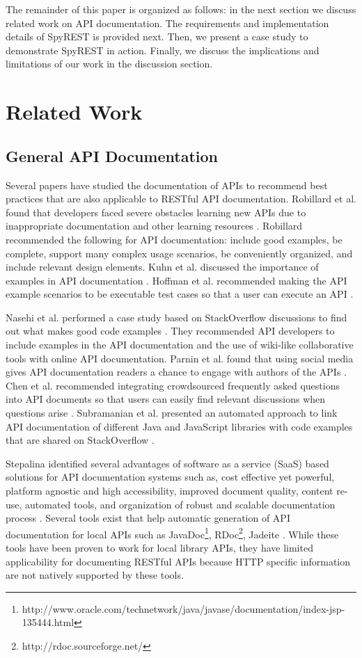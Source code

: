 \documentclass[conference]{IEEEtran}
\begin{document}
The remainder of this paper is organized as follows: in the next section we discuss related work on API documentation. The requirements and implementation details of SpyREST is provided next. Then, we present a case study to demonstrate SpyREST in action. Finally, we discuss the implications and limitations of our work in the discussion section.


\section{Related Work} %
\label{sec:related_work}
\subsection{General API Documentation} %
\label{ssub:api_learnability}
Several papers have studied the documentation of APIs to recommend best practices that are also applicable to RESTful API documentation. Robillard et al. found that  developers faced severe obstacles learning new APIs due to inappropriate documentation and other learning resources \cite{Robillard_what_makes, Robillard_a_field_study}. Robillard recommended the following for API documentation: include good examples, be complete, support many complex usage scenarios, be conveniently organized, and include relevant design elements. Kuhn et al. discussed the importance of examples in API documentation \cite{Kuhn_on_designing}. Hoffman et al. recommended making the API example scenarios to be executable test cases so that a user can execute an API \cite{Hoffman_api_documentation}.

Nasehi et al. performed a case study based on StackOverflow discussions to find out what makes good code examples \cite{Nasehi_what_makes}. They recommended API developers to include examples in the API documentation and the use of wiki-like collaborative tools with online API documentation. Parnin et al. found that using social media gives API documentation readers a chance to engage with authors of the APIs \cite{Parnin_measuring}. Chen et al. recommended integrating crowdsourced frequently asked questions into API documents so that users can easily find relevant discussions when questions arise \cite{Chen_who_asked}. Subramanian et al. presented an automated approach to link API documentation of different Java and JavaScript libraries with code examples that are shared on StackOverflow \cite{Subramanian_live}.

Stepalina identified several advantages of software as a service (SaaS) based solutions for API documentation systems such as, cost effective yet powerful, platform agnostic and high accessibility, improved document quality, content re-use, automated tools, and organization of robust and scalable documentation process \cite{Stepalina_saas}. Several tools exist that help automatic generation of API documentation for local APIs such as JavaDoc\footnote{http://www.oracle.com/technetwork/java/javase/documentation/index-jsp-135444.html}, RDoc\footnote{http://rdoc.sourceforge.net/}, Jadeite \cite{Jadeite}. While these tools have been proven to work for local library APIs, they have limited applicability for documenting RESTful APIs because HTTP specific information are not natively supported by these tools.
\end{document}
